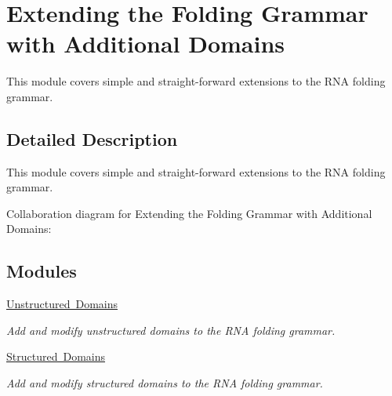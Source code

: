\hypertarget{group__domains}{}\section{Extending the Folding Grammar with Additional Domains}
\label{group__domains}


This module covers simple and straight-\/forward extensions to the R\+NA folding grammar.  




\subsection{Detailed Description}
This module covers simple and straight-\/forward extensions to the R\+NA folding grammar. 

Collaboration diagram for Extending the Folding Grammar with Additional Domains\+:
\subsection*{Modules}
\begin{DoxyCompactItemize}
\item 
\mbox{\hyperlink{group__domains__up}{Unstructured Domains}}
\begin{DoxyCompactList}\small\item\em Add and modify unstructured domains to the R\+NA folding grammar. \end{DoxyCompactList}\item 
\mbox{\hyperlink{group__domains__struc}{Structured Domains}}
\begin{DoxyCompactList}\small\item\em Add and modify structured domains to the R\+NA folding grammar. \end{DoxyCompactList}\end{DoxyCompactItemize}
